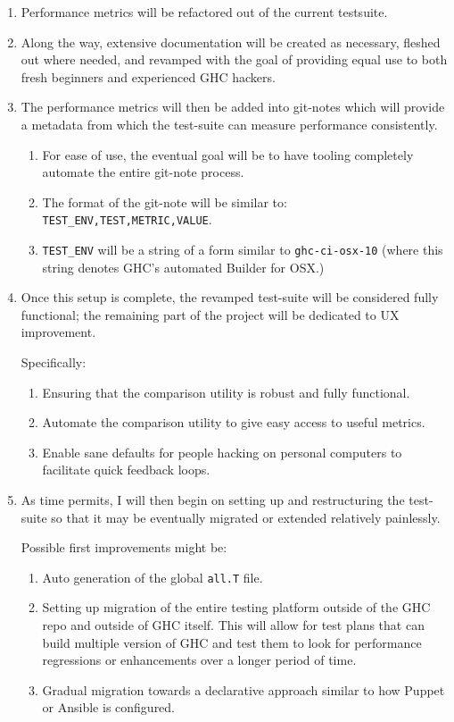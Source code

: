\documentclass{article}
\newcommand{\code}{\texttt}
\begin{document}
\begin{enumerate}
\item Performance metrics will be refactored out of the current testsuite.
\item Along the way, extensive documentation will be created as necessary, fleshed out where needed, and revamped with the goal of providing equal use to both fresh beginners and experienced GHC hackers.
\item The performance metrics will then be added into git-notes which will provide a metadata from which the test-suite can measure performance consistently.
  \begin{enumerate}
  \item For ease of use, the eventual goal will be to have tooling completely automate the entire git-note process.
  \item The format of the git-note will be similar to:\\
    \code{TEST\_ENV,TEST,METRIC,VALUE}.
  \item \code{TEST\_ENV} will be a string of a form similar to \code{ghc-ci-osx-10} (where this string denotes GHC's automated Builder for OSX.)
  \end{enumerate}
\item Once this setup is complete, the revamped test-suite will be considered fully functional; the remaining part of the project will be dedicated to UX improvement.

  Specifically:
  \begin{enumerate}
  \item Ensuring that the comparison utility is robust and fully functional.
  \item Automate the comparison utility to give easy access to useful metrics.
  \item Enable sane defaults for people hacking on personal computers to facilitate quick feedback loops.
  \end{enumerate}
\item As time permits, I will then begin on setting up and restructuring the test-suite so that it may be eventually migrated or extended relatively painlessly.

  Possible first improvements might be:
  \begin{enumerate}
  \item Auto generation of the global \code{all.T} file.
  \item Setting up migration of the entire testing platform outside of the GHC repo and outside of GHC itself.
    This will allow for test plans that can build multiple version of GHC and test them to look for performance regressions or enhancements over a longer period of time.
  \item Gradual migration towards a declarative approach similar to how Puppet or Ansible is configured.
  \end{enumerate}


\end{enumerate}
\end{document}
